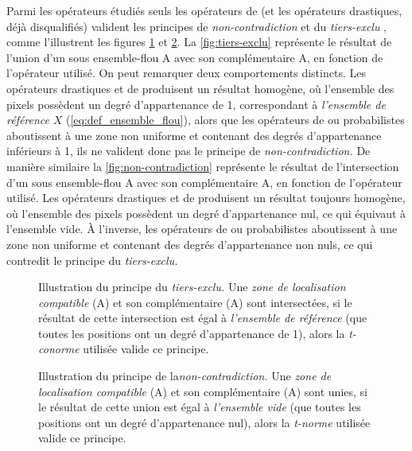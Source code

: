 Parmi les opérateurs étudiés seuls les opérateurs de 
(et les opérateurs drastiques, déjà disqualifiés) valident les
principes de \emph{non-contradiction} et du \emph{tiers-exclu}
\autocite{Bouchon-Meunier2007}, comme l'illustrent les figures
\ref{fig:tiers-exclu} et \ref{fig:non-contradiction}. La
\autoref{fig:tiers-exclu} représente le résultat de l'union d'un sous
ensemble-flou \textcolor{RdBu-9-1}{\textsf{A}} avec son complémentaire
\textcolor{RdBu-9-9}{\textsf{A}}, en fonction de l'opérateur
utilisé. On peut remarquer deux comportements distincts. Les
opérateurs drastiques et de  produisent un résultat
homogène, où l'ensemble des pixels possèdent un degré d'appartenance
de 1, correspondant à \emph{l'ensemble de référence} \(X\)
(\autoref{eq:def_ensemble_flou}), alors que les opérateurs de
 ou probabilistes aboutissent à une zone non uniforme et
contenant des degrés d'appartenance inférieurs à 1, ils ne valident
donc pas le principe de \emph{non-contradiction.} De manière similaire
la \autoref{fig:non-contradiction} représente le résultat de
l'intersection d'un sous ensemble-flou
\textcolor{RdBu-9-1}{\textsf{A}} avec son complémentaire
\textcolor{RdBu-9-9}{\textsf{A}}, en fonction de l'opérateur
utilisé. Les opérateurs drastiques et de  produisent
un résultat toujours homogène, où l'ensemble des pixels possèdent un
degré d'appartenance nul, ce qui équivaut à l'ensemble vide. À
l'inverse, les opérateurs de  ou probabilistes aboutissent
à une zone non uniforme et contenant des degrés d'appartenance non
nuls, ce qui contredit le principe du \emph{tiers-exclu.}

\begin{figure}
  \centering
  
  \caption[Illustration du principe du
  \emph{tiers-exclu}]{Illustration du principe du \emph{tiers-exclu.}
    Une \emph{zone de localisation compatible}
    (\textcolor{RdBu-9-1}{\textsf{A}}) et son complémentaire
    (\textcolor{RdBu-9-9}{\textsf{A}}) sont intersectées, si le
    résultat de cette intersection est égal à \emph{l'ensemble de
      référence} (\ie que toutes les positions ont un degré
    d'appartenance de 1), alors la \emph{t-conorme} utilisée valide ce
    principe.}
  \label{fig:tiers-exclu}
\end{figure}

\begin{figure}
  \centering
  
  \caption[Illustration du principe de la
  \emph{non-contradiction}]{Illustration du principe de
    la\emph{non-contradiction.}  Une \emph{zone de localisation
      compatible} (\textcolor{RdBu-9-1}{\textsf{A}}) et son
    complémentaire (\textcolor{RdBu-9-9}{\textsf{A}}) sont
    unies, si le résultat de cette union est égal à \emph{l'ensemble
      vide} (\ie que toutes les positions ont un degré d'appartenance
    nul), alors la \emph{t-norme} utilisée valide ce principe.}
  \label{fig:non-contradiction}
\end{figure}

